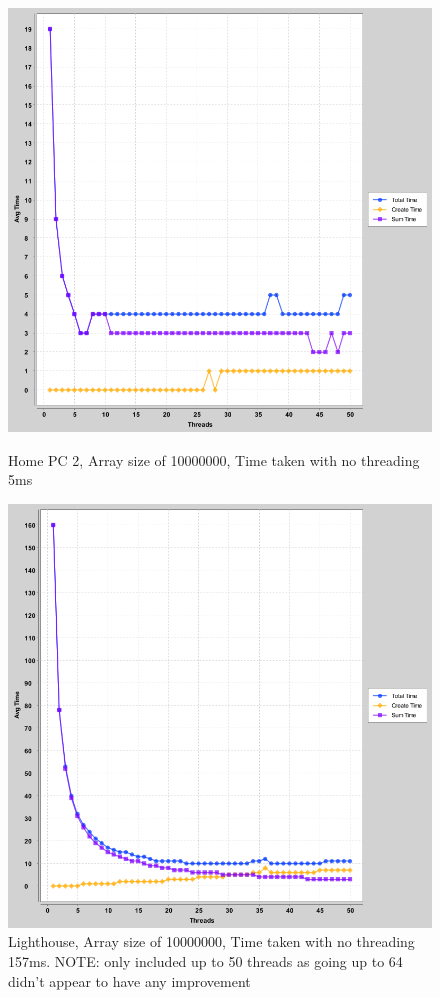 \documentclass[a4paper, 12pt]{article}
\begin{document}
		\begin{figure}[!htb]
%
  \includegraphics[width=\linewidth]{threads-vs-time-10000000-desktop.png}
  \caption{Home PC 2, Array size of 10000000, Time taken with no threading 5ms}
\endminipage\hfill
{}%
  \includegraphics[width=\linewidth]{threads-vs-time-10000000-lighthouse.png}
  \caption{Lighthouse, Array size of 10000000, Time taken with no threading 157ms. NOTE: only included up to 50 threads as going up to 64 didn't appear to have any improvement}
\endminipage\hfill
		\end{figure}		
		
\end{document}
